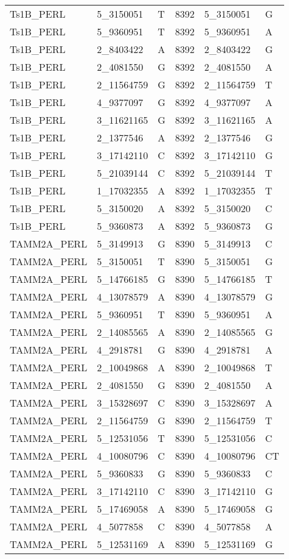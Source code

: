 \begin{center}
\begin{longtable}{|l|l|l|l|l|l|}
Ts1B\_PERL&5\_3150051&T&8392&5\_3150051&G\\
Ts1B\_PERL&5\_9360951&T&8392&5\_9360951&A\\
Ts1B\_PERL&2\_8403422&A&8392&2\_8403422&G\\
Ts1B\_PERL&2\_4081550&G&8392&2\_4081550&A\\
Ts1B\_PERL&2\_11564759&G&8392&2\_11564759&T\\
Ts1B\_PERL&4\_9377097&G&8392&4\_9377097&A\\
Ts1B\_PERL&3\_11621165&G&8392&3\_11621165&A\\
Ts1B\_PERL&2\_1377546&A&8392&2\_1377546&G\\
Ts1B\_PERL&3\_17142110&C&8392&3\_17142110&G\\
Ts1B\_PERL&5\_21039144&C&8392&5\_21039144&T\\
Ts1B\_PERL&1\_17032355&A&8392&1\_17032355&T\\
Ts1B\_PERL&5\_3150020&A&8392&5\_3150020&C\\
Ts1B\_PERL&5\_9360873&A&8392&5\_9360873&G\\
TAMM2A\_PERL&5\_3149913&G&8390&5\_3149913&C\\
TAMM2A\_PERL&5\_3150051&T&8390&5\_3150051&G\\
TAMM2A\_PERL&5\_14766185&G&8390&5\_14766185&T\\
TAMM2A\_PERL&4\_13078579&A&8390&4\_13078579&G\\
TAMM2A\_PERL&5\_9360951&T&8390&5\_9360951&A\\
TAMM2A\_PERL&2\_14085565&A&8390&2\_14085565&G\\
TAMM2A\_PERL&4\_2918781&G&8390&4\_2918781&A\\
TAMM2A\_PERL&2\_10049868&A&8390&2\_10049868&T\\
TAMM2A\_PERL&2\_4081550&G&8390&2\_4081550&A\\
TAMM2A\_PERL&3\_15328697&C&8390&3\_15328697&A\\
TAMM2A\_PERL&2\_11564759&G&8390&2\_11564759&T\\
TAMM2A\_PERL&5\_12531056&T&8390&5\_12531056&C\\
TAMM2A\_PERL&4\_10080796&C&8390&4\_10080796&CT\\
TAMM2A\_PERL&5\_9360833&G&8390&5\_9360833&C\\
TAMM2A\_PERL&3\_17142110&C&8390&3\_17142110&G\\
TAMM2A\_PERL&5\_17469058&A&8390&5\_17469058&G\\
TAMM2A\_PERL&4\_5077858&C&8390&4\_5077858&A\\
TAMM2A\_PERL&5\_12531169&A&8390&5\_12531169&G\\

\end{longtable}
\end{center}
